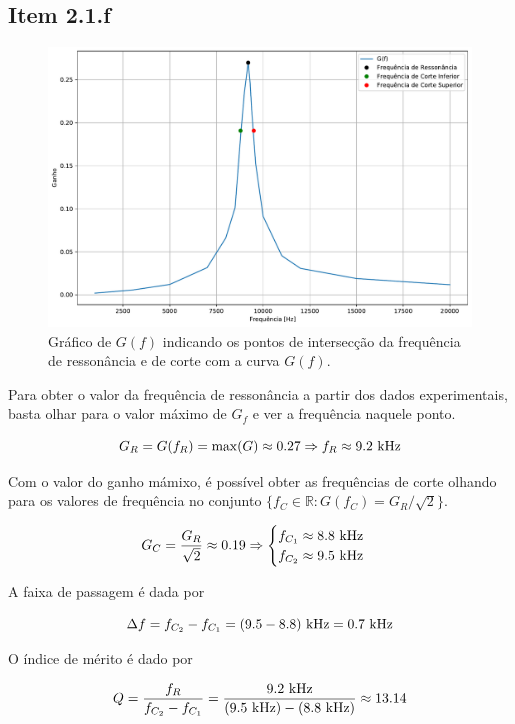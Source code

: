 \documentclass[11pt]{article}
\begin{document}
\subsection*{Item 2.1.f}

\begin{figure}[h!]
  \centering
  \includegraphics[width=.82\textwidth]{fig/2-1f}
  \caption{Gráfico de $G(f)$ indicando os pontos de intersecção da frequência de ressonância e de corte com a curva $G(f)$.}
\end{figure}

Para obter o valor da frequência de ressonância a partir dos dados experimentais, basta olhar para o valor máximo de $G_{f}$ e ver a frequência naquele ponto.

$$
  G_{R} = G(f_{R}) = \max(G) \approx 0.27 \Rightarrow f_{R} \approx 9.2\ \textnormal{kHz}
$$

Com o valor do ganho mámixo, é possível obter as frequências de corte olhando para os valores de frequência no conjunto $\{f_{C} \in \mathbb{R} : G(f_{C}) = G_{R}/\sqrt{2}\}$.

$$
  G_{C} = \frac{G_{R}}{\sqrt{2}} \approx 0.19 \Rightarrow
  \begin{cases}
    f_{C_{1}} \approx 8.8\ \textnormal{kHz} \\
    f_{C_{2}} \approx 9.5\ \textnormal{kHz}
  \end{cases}
$$

A faixa de passagem é dada por

$$
  \Delta f = f_{C_{2}} - f_{C_{1}} = (9.5 - 8.8)\ \textnormal{kHz} = 0.7\ \textnormal{kHz}
$$

O índice de mérito é dado por

$$
  Q = \frac{f_{R}}{f_{C_{2}} - f_{C_{1}}} = \frac{9.2\ \textnormal{kHz}}{(9.5\ \textnormal{kHz}) - (8.8\ \textnormal{kHz})} \approx 13.14
$$
\end{document}
